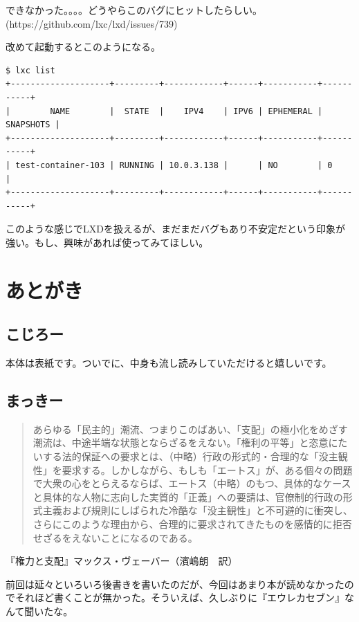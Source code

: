 ﻿\documentclass[9pt,b5paper,tombo,openany]{jsbook}
\begin{document}
\noindent
できなかった。。。。どうやらこのバグにヒットしたらしい。(https://github.com/lxc/lxd/issues/739)

\noindent
改めて起動するとこのようになる。
\begin{lstlisting}
$ lxc list
+--------------------+---------+------------+------+-----------+-----------+
|        NAME        |  STATE  |    IPV4    | IPV6 | EPHEMERAL | SNAPSHOTS |
+--------------------+---------+------------+------+-----------+-----------+
| test-container-103 | RUNNING | 10.0.3.138 |      | NO        | 0         |
+--------------------+---------+------------+------+-----------+-----------+
\end{lstlisting}

\noindent
このような感じでLXDを扱えるが、まだまだバグもあり不安定だという印象が強い。もし、興味があれば使ってみてほしい。

\chapter{あとがき}

\section*{こじろー}
本体は表紙です。ついでに、中身も流し読みしていただけると嬉しいです。

\section*{まっきー}

\begin{quote}
あらゆる「民主的」潮流、つまりこのばあい、「支配」の極小化をめざす潮流は、中途半端な状態とならざるをえない。「権利の平等」と恣意にたいする法的保証への要求とは、（中略）行政の形式的・合理的な「没主観性」を要求する。しかしながら、もしも「エートス」が、ある個々の問題で大衆の心をとらえるならば、エートス（中略）のもつ、具体的なケースと具体的な人物に志向した実質的「正義」への要請は、官僚制的行政の形式主義および規則にしばられた冷酷な「没主観性」と不可避的に衝突し、さらにこのような理由から、合理的に要求されてきたものを感情的に拒否せざるをえないことになるのである。
\end{quote}

\begin{flushright}
『権力と支配』マックス・ヴェーバー（濱嶋朗　訳）
\end{flushright}

前回は延々といろいろ後書きを書いたのだが、今回はあまり本が読めなかったのでそれほど書くことが無かった。そういえば、久しぶりに『エウレカセブン』なんて聞いたな。
\end{document}
